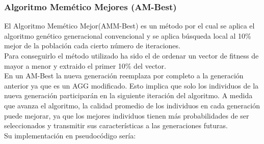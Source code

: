 \subsubsection{Algoritmo Memético Mejores (AM-Best)}
El Algoritmo Memético Mejor(AMM-Best) es un método por el cual se aplica el algoritmo genético generacional convencional y se aplica búsqueda local al 10\% mejor de la población cada cierto número de iteraciones.\\

Para conseguirlo el método utilizado ha sido el de ordenar un vector de fitness de mayor a menor y extraido el primer 10\% del vector.\\

En un AM-Best la nueva generación reemplaza por completo a la generación anterior ya que es un AGG modificado. Esto implica que solo los individuos de la nueva generación participarán en la siguiente iteración del algoritmo. A medida que avanza el algoritmo, la calidad promedio de los individuos en cada generación puede mejorar, ya que los mejores individuos tienen más probabilidades de ser seleccionados y transmitir sus características a las generaciones futuras.\\

Su implementación en pseudocódigo sería:

